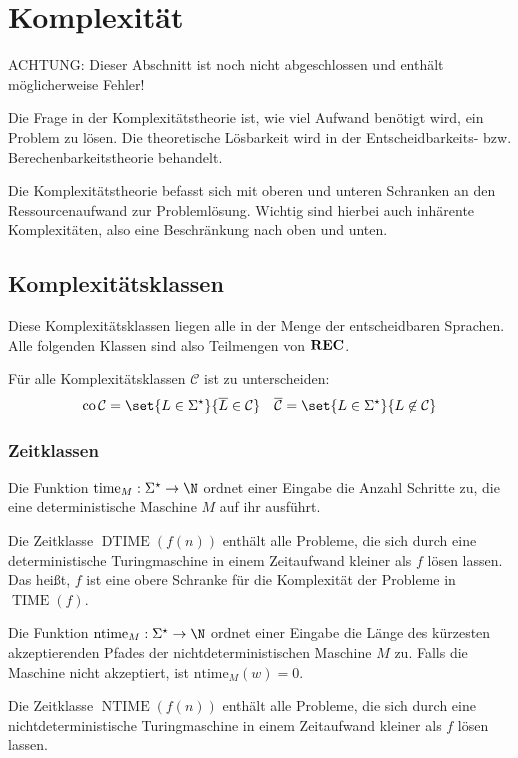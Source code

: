 \chapter{Komplexität}
{\color{red}ACHTUNG: Dieser Abschnitt ist noch nicht abgeschlossen und enthält möglicherweise Fehler!}

Die Frage in der Komplexitätstheorie ist, wie viel Aufwand benötigt wird, ein Problem zu lösen.
Die theoretische Lösbarkeit wird in der Entscheidbarkeits- bzw. Berechenbarkeitstheorie behandelt.

Die Komplexitätstheorie befasst sich mit oberen und unteren Schranken an den Ressourcenaufwand zur Problemlösung.
Wichtig sind hierbei auch inhärente Komplexitäten, also eine Beschränkung nach oben und unten.
\section{Komplexitätsklassen}
Diese Komplexitätsklassen liegen alle in der Menge der entscheidbaren Sprachen. Alle folgenden Klassen sind also Teilmengen von $\operatorname{\mathbf{REC}}$.

Für alle Komplexitätsklassen $\mathcal C$ ist zu unterscheiden:
\begin{align*}
	\operatorname{co}\mathcal C=\set{L\in\Sigma^\star}{\overline L \in\mathcal C} && \overline{\mathcal C}=\set{L\in\Sigma^\star}{L\not\in \mathcal C}
\end{align*}
\subsection{Zeitklassen}
\begin{multicols}{2}
	Die Funktion $\mathrm{time}_M:\Sigma^\star\rightarrow \N$ ordnet einer Eingabe die Anzahl Schritte zu, die eine deterministische Maschine $M$ auf ihr ausführt.

	Die Zeitklasse $\operatorname{DTIME}(f(n))$ enthält alle Probleme, die sich durch eine deterministische Turingmaschine in einem Zeitaufwand kleiner als $f$ lösen lassen. Das heißt, $f$ ist eine obere Schranke für die Komplexität der Probleme in $\operatorname{TIME}(f)$.

	\columnbreak

	Die Funktion $\mathrm{ntime}_M:\Sigma^\star\rightarrow \N$ ordnet einer Eingabe die Länge des kürzesten akzeptierenden Pfades der nichtdeterministischen Maschine $M$ zu. Falls die Maschine nicht akzeptiert, ist $\mathrm{ntime}_M(w)=0$.

	Die Zeitklasse $\operatorname{NTIME}(f(n))$ enthält alle Probleme, die sich durch eine nichtdeterministische Turingmaschine in einem Zeitaufwand kleiner als $f$ lösen lassen.
\end{multicols}


